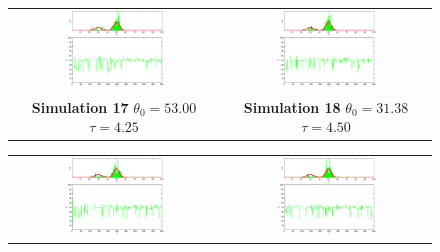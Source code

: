 \begin{figure}\label{fig: SimulationMetropolisHasting2}
\begin{tabular}{cc} 
\includegraphics[width=0.5\textwidth]{ImaginiLatex/MetropolisExample17.eps} &
\includegraphics[width=0.5\textwidth]{ImaginiLatex/MetropolisExample18.eps} \\
\textbf{Simulation 17} $\theta_0=   53.00$  $\tau=    4.25$  & \textbf{Simulation 18} $\theta_0=   31.38$  $\tau=    4.50$
\end{tabular}
\begin{tabular}{cc} 
\includegraphics[width=0.5\textwidth]{ImaginiLatex/MetropolisExample19.eps} &
\includegraphics[width=0.5\textwidth]{ImaginiLatex/MetropolisExample20.eps} \\

\end{tabular}
\end{figure}
